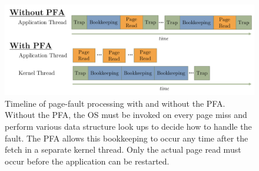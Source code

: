 \begin{figure}[h]
    \centering
    \includegraphics[width=\columnwidth]{figs/bookkeeping_timeline.pdf}
    \vspace{-5mm}
    \caption{Timeline of page-fault processing with and without the PFA. Without the PFA, the OS must be invoked on every page miss and perform various data structure look ups to decide how to handle the fault. The PFA allows this bookkeeping to occur any time after the fetch in a separate kernel thread. Only the actual page read must occur before the application can be restarted.}
    \label{fig:bookkeeping_timeline}
\end{figure}


